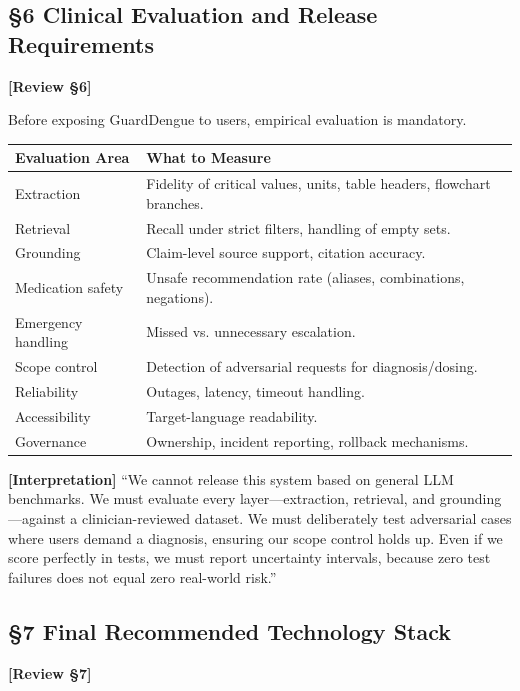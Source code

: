 \documentclass[11pt,a4paper]{article}
\newcommand{\origintag}[2]{\textcolor{#1}{\small\textbf{[#2]}}}
\begin{document}
\subsection{\S6 Clinical Evaluation and Release Requirements}
\origintag{amber}{Review \S6}

Before exposing GuardDengue to users, empirical evaluation is mandatory.

\begin{table}[ht]
\centering
\begin{tabularx}{\textwidth}{lX}
\toprule
\textbf{Evaluation Area} & \textbf{What to Measure} \\
\midrule
Extraction & Fidelity of critical values, units, table headers, flowchart branches. \\
Retrieval & Recall under strict filters, handling of empty sets. \\
Grounding & Claim-level source support, citation accuracy. \\
Medication safety & Unsafe recommendation rate (aliases, combinations, negations). \\
Emergency handling & Missed vs. unnecessary escalation. \\
Scope control & Detection of adversarial requests for diagnosis/dosing. \\
Reliability & Outages, latency, timeout handling. \\
Accessibility & Target-language readability. \\
Governance & Ownership, incident reporting, rollback mechanisms. \\
\bottomrule
\end{tabularx}
\end{table}

\begin{sayit}
\origintag{slate}{Interpretation} ``We cannot release this system based on general LLM benchmarks. We must evaluate every layer---extraction, retrieval, and grounding---against a clinician-reviewed dataset. We must deliberately test adversarial cases where users demand a diagnosis, ensuring our scope control holds up. Even if we score perfectly in tests, we must report uncertainty intervals, because zero test failures does not equal zero real-world risk.''
\end{sayit}


\subsection{\S7 Final Recommended Technology Stack}
\origintag{amber}{Review \S7}
\end{document}
